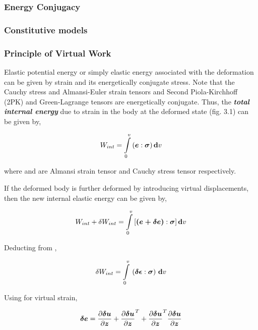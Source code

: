 \subsubsection{Energy Conjugacy}



\subsubsection{Constitutive models}



\subsubsection{Principle of Virtual Work}
Elastic potential energy or simply elastic energy associated with the
deformation can be given by strain and its energetically conjugate stress.
Note that the Cauchy stress and Almansi-Euler strain tensors and Second
Piola-Kirchhoff (2PK) and Green-Lagrange tensors are energetically
conjugate. Thus, the \textit{\textbf{total internal energy}} due to strain in
the body at the deformed state (fig. 3.1) can be given by,
 
\begin{equation}
  W_{int}=\gint{0}{v}{(\vect{e}:\vect{\sigma})}v
  \label{eqn:totalenergy}
\end{equation}

where  and \vect{\sigma} are Almansi strain tensor and Cauchy stress
tensor respectively.

If the deformed body is further deformed by introducing virtual displacements,
then the new internal elastic energy can be given by,

\begin{equation}
  {W_{int}+\delta W_{int}}=\gint{0}{v}{[\vect{(e+\delta{e})}:\vect{\sigma}]}v
  \label{eqn:virtualtotalenergy}
\end{equation}

Deducting  from ,

\begin{equation}
  \delta W_{int}=\gint{0}{v}{\pbrac{\vect{\delta \epsilon} : \vect{\sigma}}}v
  \label{eqn:virtualenergy}
\end{equation}

Using  for virtual strain,

\begin{equation}
  \vect{\delta e}=\delby{\vect{\delta u}}{\vect{z}} + \transpose{\delby{\vect{\delta u}}{\vect{z}}} + 
                  \transpose{\delby{\vect{\delta u}}{\vect{z}}}\delby{\vect{\delta u}}{\vect{z}}
  \label{eqn:virtualalmansidisplacement}
\end{equation}

